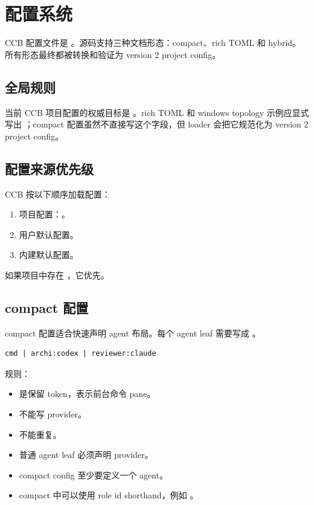 \chapter{配置系统}

CCB 配置文件是 。源码支持三种文档形态：compact、rich TOML 和 hybrid。所有形态最终都被转换和验证为 version 2 project config。

\section{全局规则}

当前 CCB 项目配置的权威目标是 。rich TOML 和 windows topology 示例应显式写出 ；compact 配置虽然不直接写这个字段，但 loader 会把它规范化为 version 2 project config。

\section{配置来源优先级}

CCB 按以下顺序加载配置：

\begin{enumerate}
  \item 项目配置：。
  \item 用户默认配置。
  \item 内建默认配置。
\end{enumerate}

如果项目中存在 ，它优先。

\section{compact 配置}

compact 配置适合快速声明 agent 布局。每个 agent leaf 需要写成 。

\begin{lstlisting}
cmd | archi:codex | reviewer:claude
\end{lstlisting}

规则：

\begin{itemize}
  \item {} 是保留 token，表示前台命令 pane。
  \item {} 不能写 provider。
  \item {} 不能重复。
  \item 普通 agent leaf 必须声明 provider。
  \item compact config 至少要定义一个 agent。
  \item compact 中可以使用 role id shorthand，例如 。
\end{itemize}

